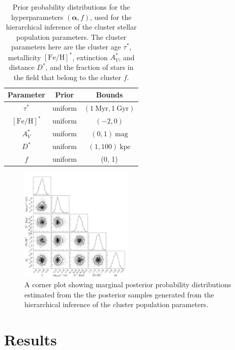 \documentclass[twocolumn]{aastex62}
\newcommand{\bs}[1]{\boldsymbol{#1}}
\newcommand{\kpc}{\textrm{kpc}}
\newcommand{\feh}{\ensuremath{[\textrm{Fe} / \textrm{H}]}}
\begin{document}
\begin{table}[hbt]
\begin{center}
    \begin{tabular}{ c | c | c }
        \toprule
        Parameter & Prior & Bounds \\
        \toprule
        $\tau^*$ & uniform & $(1~\textrm{Myr}, 1~\textrm{Gyr})$ \\
        $\feh^*$ & uniform & $(-2, 0)$ \\
        $A_V^*$ & uniform & $(0, 1)~\textrm{mag}$ \\
        $D^*$ & uniform & $(1, 100)~\kpc$ \\
        $f$ & uniform & (0, 1) \\
        \toprule
    \end{tabular}
\caption{Prior probability distributions for the hyperparameters $(\bs{\alpha}, f)$, used for the hierarchical inference of the cluster stellar population parameters.
The cluster parameters here are the cluster age $\tau^*$, metallicity $\feh^*$, extinction $A_V^*$, and distance $D^*$, and the fraction of stars in the field that belong to the cluster $f$.
\label{tbl:hyperpriors}}
\end{center}
\end{table}

\begin{figure}
\centering
\includegraphics[width=0.48\textwidth]{figures/hierarch-corner.pdf}
\caption{A corner plot showing marginal posterior probability distributions estimated from the the posterior samples generated from the hierarchical inference of the cluster population parameters.}
\label{fig:hierarch-corner}
\end{figure}


\section{Results} \label{sec:results}
\end{document}
